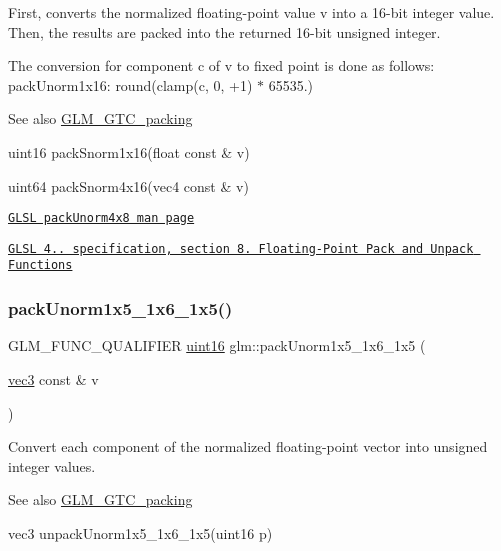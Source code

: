 First, converts the normalized floating-\/point value v into a 16-\/bit integer value. Then, the results are packed into the returned 16-\/bit unsigned integer.

The conversion for component c of v to fixed point is done as follows\+: pack\+Unorm1x16\+: round(clamp(c, 0, +1) $\ast$ 65535.)

\begin{DoxySeeAlso}{See also}
\hyperlink{group__gtc__packing}{G\+L\+M\+\_\+\+G\+T\+C\+\_\+packing} 

uint16 pack\+Snorm1x16(float const \& v) 

uint64 pack\+Snorm4x16(vec4 const \& v) 

\href{http://www.opengl.org/sdk/docs/manglsl/xhtml/packUnorm4x8.xml}{\tt G\+L\+SL pack\+Unorm4x8 man page} 

\href{http://www.opengl.org/registry/doc/GLSLangSpec.4.20.8.pdf}{\tt G\+L\+SL 4.. specification, section 8. Floating-\/\+Point Pack and Unpack Functions} 
\end{DoxySeeAlso}
\mbox{\label{group__gtc__packing_ga0fcb493167d540aca105d11df5c55503}} 
\subsubsection{\texorpdfstring{pack\+Unorm1x5\+\_\+1x6\+\_\+1x5()}{packUnorm1x5\_1x6\_1x5()}}
{\footnotesize\ttfamily G\+L\+M\+\_\+\+F\+U\+N\+C\+\_\+\+Q\+U\+A\+L\+I\+F\+I\+ER \hyperlink{group__gtc__type__precision_gad8c2939e1fdd8e5828b31d95c52255d5}{uint16} glm\+::pack\+Unorm1x5\+\_\+1x6\+\_\+1x5 (\begin{DoxyParamCaption}\item[{\hyperlink{group__core__types_ga1c47e8b3386109bc992b6c48e91b0be7}{vec3} const \&}]{v }\end{DoxyParamCaption})}

Convert each component of the normalized floating-\/point vector into unsigned integer values.

\begin{DoxySeeAlso}{See also}
\hyperlink{group__gtc__packing}{G\+L\+M\+\_\+\+G\+T\+C\+\_\+packing} 

vec3 unpack\+Unorm1x5\+\_\+1x6\+\_\+1x5(uint16 p) 
\end{DoxySeeAlso}
\mbox{\label{group__gtc__packing_ga2f9963e5d762b10085b280d3662017ba}} 
